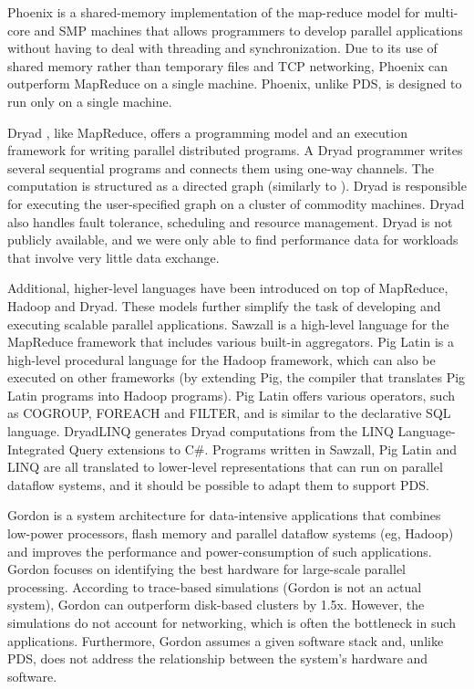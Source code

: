 \documentclass{acm_proc_article-sp}
\begin{document}
Phoenix \cite{phoenix} is a shared-memory implementation of the map-reduce
model for multi-core and SMP machines that allows programmers to develop
parallel applications without having to deal with threading and
synchronization. Due to its use of shared memory rather than temporary files
and TCP networking, Phoenix can  outperform MapReduce on a single machine.
Phoenix, unlike PDS, is designed to run only on a single machine.

Dryad \cite{dryad}, like MapReduce, offers a programming model and an execution
framework for writing parallel distributed programs. A Dryad programmer writes
several sequential programs and connects them using one-way channels. The
computation is structured as a directed graph (similarly to
\cite{paralleldatabases}). Dryad is responsible for executing the
user-specified graph on a cluster of commodity machines. Dryad also handles
fault tolerance, scheduling and resource management. Dryad is not publicly
available, and we were only able to find performance data for workloads that
involve very little data exchange.

Additional, higher-level languages have been introduced on top of MapReduce,
Hadoop and Dryad. These models further simplify the task of developing and
executing scalable parallel applications. Sawzall \cite{sawzall} is a
high-level language for the MapReduce framework that includes various built-in
aggregators. Pig Latin \cite{piglatin} is a high-level procedural language for
the Hadoop framework, which can also be executed on other frameworks (by
extending Pig, the compiler that translates Pig Latin programs into Hadoop
programs). Pig Latin offers various operators, such as COGROUP, FOREACH and
FILTER, and is similar to the declarative SQL language. DryadLINQ
\cite{dryadlinq} generates Dryad computations from the LINQ Language-Integrated
Query extensions to C\#. Programs written in Sawzall, Pig Latin and LINQ are
all translated to lower-level representations that can run on parallel dataflow
systems, and it should be possible to adapt them to support PDS.

Gordon \cite{gordon} is a system architecture for data-intensive applications
that combines low-power processors, flash memory and parallel dataflow systems
(eg, Hadoop) and improves the performance and power-consumption of such
applications. Gordon focuses on identifying the best hardware for large-scale
parallel processing. According to trace-based simulations (Gordon is not an
actual system), Gordon can outperform disk-based clusters by 1.5x. However, the
simulations do not account for networking, which is often the bottleneck in
such applications. Furthermore, Gordon assumes a given software stack and,
unlike PDS, does not address the relationship between the system's hardware and
software.
\end{document}
